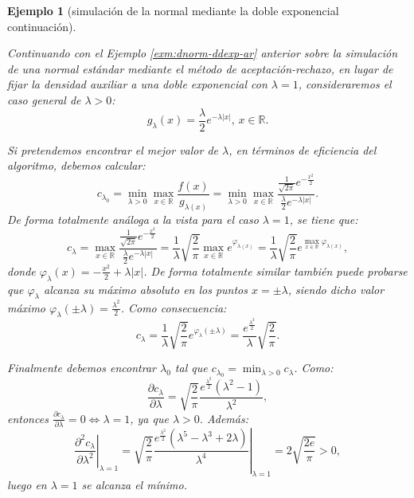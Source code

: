 \documentclass[
  10pt,
]{book}
\theoremstyle{break}
\newtheorem{example}{Ejemplo}[chapter]
\theoremstyle{nonumberplain}
\begin{document}
\begin{example}[simulación de la normal mediante la doble exponencial continuación]
\protect\hypertarget{exm:dnorm-ddexp-arb}{}\label{exm:dnorm-ddexp-arb}

Continuando con el Ejemplo \ref{exm:dnorm-ddexp-ar} anterior sobre la simulación de una normal estándar mediante el método de aceptación-rechazo, en lugar de fijar la densidad auxiliar a una doble exponencial con \(\lambda=1\), consideraremos el caso general de \(\lambda>0\):
\[g_{\lambda}(x)  = \frac{\lambda}{2}e^{-\lambda\left| x \right|} \text{, } x\in\mathbb{R}.\]

Si pretendemos encontrar el mejor valor de \(\lambda\), en términos de eficiencia del algoritmo, debemos calcular:
\[c_{\lambda_{0}} = \min_{\lambda>0}\max_{x\in\mathbb{R}}\frac{f(x)}{g_{\lambda(x)}}
=\min_{\lambda>0}\max_{x\in\mathbb{R}}\frac{\frac{1}{\sqrt{2\pi}}e^{-\frac{x^{2}}{2}}}{\frac{\lambda}{2}e^{-\lambda \left| x \right| }}.\]
De forma totalmente análoga a la vista para el caso \(\lambda=1\), se tiene que:
\[c_{\lambda}=\max_{x\in\mathbb{R}}\frac{\frac{1}{\sqrt{2\pi}}e^{-\frac{x^{2}}{2}}}{\frac{\lambda}{2}e^{-\lambda \left| x \right|  }}=\frac{1}{\lambda}\sqrt{\frac{2}{\pi}}\max_{x\in\mathbb{R}}e^{\varphi
_{\lambda(x)}}=\frac{1}{\lambda}\sqrt{\frac{2}{\pi}}e^{\max_{x\in\mathbb{R}}\varphi_{\lambda(x)} },\]
donde \(\varphi_{\lambda}(x) =-\frac{x^{2}}{2}+\lambda\left| x \right|\).
De forma totalmente similar también puede probarse que \(\varphi_{\lambda}\) alcanza su máximo absoluto en los puntos \(x=\pm\lambda\), siendo dicho valor máximo
\(\varphi_{\lambda}\left( \pm\lambda \right) = \frac{\lambda^{2}}{2}\).
Como consecuencia:
\[c_{\lambda}=\frac{1}{\lambda}\sqrt{\frac{2}{\pi}}e^{\varphi_{\lambda}\left( \pm\lambda \right)} =\frac{e^{\frac{\lambda^{2}}{2}}}{\lambda}\sqrt{\frac{2}{\pi}}.\]

Finalmente debemos encontrar \(\lambda_{0}\) tal que \(c_{\lambda_{0}}=\min_{\lambda>0}c_{\lambda}\).
Como:
\[\frac{\partial c_{\lambda}}{\partial \lambda} =\sqrt{\frac{2}{\pi}}\frac{e^{\frac{\lambda^{2}}{2}}\left( \lambda^{2}-1\right)  }{\lambda^{2}},\]
entonces \(\frac{\partial c_{\lambda}}{\partial \lambda} = 0\Leftrightarrow\lambda=1\), ya que \(\lambda>0\).
Además:
\[\left. \frac{\partial ^{2}c_{\lambda}}{\partial \lambda^{2}}\right|_{\lambda=1} =\left.\sqrt{\frac
{2}{\pi}}\frac{e^{\frac{\lambda^{2}}{2}}\left(  \lambda^{5}-\lambda
^{3}+2\lambda\right)  }{\lambda^{4}}\right|_{\lambda=1}=2\sqrt{\frac{2e}{\pi}}>0,\]
luego en \(\lambda=1\) se alcanza el mínimo.


\end{example}
\end{document}
